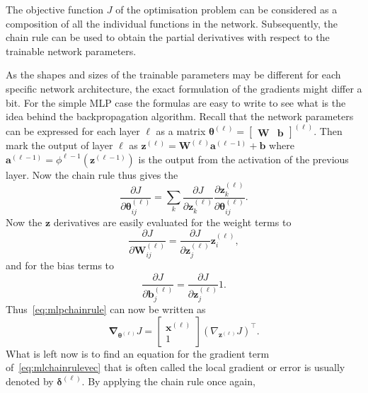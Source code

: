 The objective function $J$ of the optimisation problem can be considered as a composition of all the individual functions in the network.
Subsequently, the chain rule can be used to obtain the partial derivatives with respect to the trainable network parameters.

As the shapes and sizes of the trainable parameters may be different for each specific network architecture, the exact formulation of the gradients might differ a bit.
For the simple MLP case the formulas are easy to write to see what is the idea behind the backpropagation algorithm.
Recall that the network parameters can be expressed for each layer $\ell$ as a matrix $\bm{\theta}^{(\ell)} = \begin{bmatrix} \bm{W} & \bm{b} \end{bmatrix}^{(\ell)}$. Then mark the output of layer $\ell$ as $\bm{z}^{(\ell)} = \bm{W}^{(\ell)} \bm{a}^{(\ell-1)} + \bm{b}$ where $\bm{a}^{(\ell-1)} =  \phi^{\ell-1}(\bm{z}^{(\ell-1)})$ is the output from the activation of the previous layer.
Now the chain rule thus gives the
\begin{equation}\label{eq:mlpchainrule}
    \frac{\partial J}{\partial \bm{\theta}_{ij}^{(\ell)}} = \sum_{k} \frac{\partial J}{\partial \bm{z}_{k}^{(\ell)}} \frac{\partial \bm{z}_{k}^{(\ell)}}{\partial \bm{\theta}_{ij}^{(\ell)}}. 
\end{equation}
Now the $\bm{z}$ derivatives are easily evaluated for the weight terms to
\begin{equation}
    \frac{\partial J}{\partial \bm{W}_{ij}^{(\ell)}} = \frac{\partial J}{\partial \bm{z}_{j}^{(\ell)}} \bm{z}_{i}^{(\ell)},
\end{equation}
and for the bias terms to
\begin{equation}
    \frac{\partial J}{\partial \bm{b}_{j}^{(\ell)}} = \frac{\partial J}{\partial \bm{z}_{j}^{(\ell)}} 1.
\end{equation}
Thus~\eqref{eq:mlpchainrule} can now be written as
\begin{equation}\label{eq:mlchainrulevec}
    \bm{\nabla}_{\bm{\theta}^{(\ell)}} J = \begin{bmatrix} \bm{x}^{(\ell)} \\ 1 \end{bmatrix} (\nabla_{\bm{z}^{(\ell)}} J)^{\top}.
\end{equation}
What is left now is to find an equation for the gradient term of~\eqref{eq:mlchainrulevec} that is often called the local gradient or error is usually denoted by $\bm{\delta}^{(\ell)}$.
By applying the chain rule once again,
